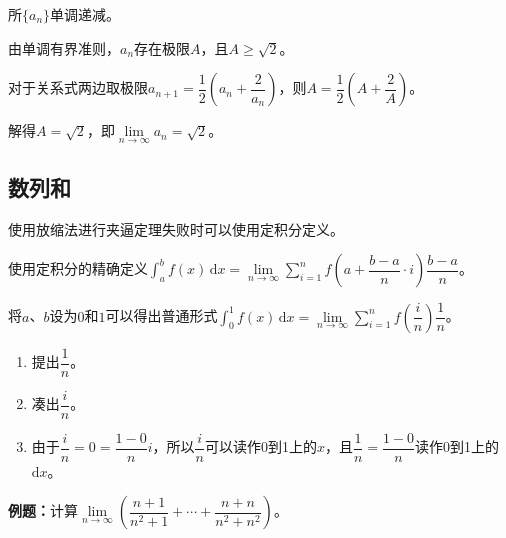 \documentclass[UTF8, 12pt]{ctexart}
\begin{document}
所$\{a_n\}$单调递减。

由单调有界准则，${a_n}$存在极限$A$，且$A\geqslant\sqrt{2}$。

对于关系式两边取极限$a_{n+1}=\dfrac{1}{2}\left(a_n+\dfrac{2}{a_n}\right)$，则$A=\dfrac{1}{2}\left(A+\dfrac{2}{A}\right)$。

解得$A=\sqrt{2}$，即$\lim\limits_{n\to\infty}a_n=\sqrt{2}$。

\subsection{数列和}

使用放缩法进行夹逼定理失败时可以使用定积分定义。

使用定积分的精确定义$\displaystyle\int_a^bf(x)\,\textrm{d}x=\lim\limits_{n\to\infty}\sum\limits_{i=1}^nf\left(a+\dfrac{b-a}{n}\cdot i\right)\dfrac{b-a}{n}$。

将$a$、$b$设为$0$和$1$可以得出普通形式$\displaystyle\int_0^1f(x)\,\textrm{d}x=\lim\limits_{n\to\infty}\sum\limits_{i=1}^nf\left(\dfrac{i}{n}\right)\dfrac{1}{n}$。

\begin{enumerate}
    \item 提出$\dfrac{1}{n}$。
    \item 凑出$\dfrac{i}{n}$。
    \item 由于$\dfrac{i}{n}=0=\dfrac{1-0}{n}i$，所以$\dfrac{i}{n}$可以读作0到1上的$x$，且$\dfrac{1}{n}=\dfrac{1-0}{n}$读作0到1上的$\textrm{d}x$。
\end{enumerate}

\textbf{例题：}计算$\lim\limits_{n\to\infty}\left(\dfrac{n+1}{n^2+1}+\cdots+\dfrac{n+n}{n^2+n^2}\right)$。
\end{document}
